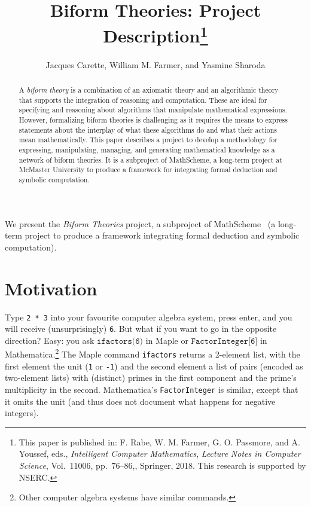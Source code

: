 \documentclass[fleqn]{llncs}
\title{Biform Theories: Project Description\thanks{This paper is
    published in: F. Rabe, W. M. Farmer, G. O. Passmore, and
    A. Youssef, eds., \emph{Intelligent Computer Mathematics},
    \emph{Lecture Notes in Computer Science}, Vol.~11006, pp.~76--86,,
    Springer, 2018. This research is supported by NSERC.}}
\author{Jacques Carette, William M. Farmer, and Yasmine Sharoda}
\institute{%
Computing and Software, McMaster University, Canada\\
\url{http://www.cas.mcmaster.ca/~carette}\\
\url{http://imps.mcmaster.ca/wmfarmer}\\[1.5ex]
14 August 2018
}
\begin{document}
\maketitle

\begin{abstract}
A \emph{biform theory} is a combination of an axiomatic theory and an
algorithmic theory that supports the integration of reasoning and
computation.  These are ideal for specifying and reasoning about
algorithms that manipulate mathematical expressions.  However,
formalizing biform theories is challenging as it requires the means to
express statements about the interplay of what these algorithms do and
what their actions mean mathematically.  This paper describes a
project to develop a methodology for expressing, manipulating,
managing, and generating mathematical knowledge as a network of biform
theories.  It is a subproject of MathScheme, a long-term project at
McMaster University to produce a framework for integrating formal
deduction and symbolic computation.
\end{abstract}

\iffalse 

\textbf{Keywords:} Axiomatic mathematics, algorithmic mathematics, biform
theories, symbolic computation, reasoning about syntax, meaning
formulas, theory graphs.

\fi

\noindent
We present the \emph{Biform Theories} project, a
subproject of MathScheme~\cite{CaretteEtAl11} (a long-term project
to produce a framework integrating formal
deduction and symbolic computation).

\section{Motivation}\label{sec:problem}

Type \texttt{2 * 3} into your favourite computer algebra system, press
enter, and you will receive (unsurprisingly) \texttt{6}. But what if
you want to go in the opposite direction?  Easy: you ask
$\texttt{ifactors(6)}$ in Maple or $\texttt{FactorInteger[6]}$ in
Mathematica.\footnote{Other computer algebra systems have similar
  commands.}  The Maple command \texttt{ifactors} returns a 2-element
list, with the first element the unit (\texttt{1} or \texttt{-1}) and
the second element a list of pairs (encoded as two-element lists) with
(distinct) primes in the first component and the prime's multiplicity
in the second. Mathematica's \texttt{FactorInteger} is similar, except
that it omits the unit (and thus does not document what happens for
negative integers).
\end{document}
